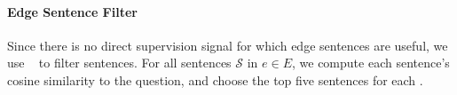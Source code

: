 \paragraph{Edge Sentence Filter}

Since there is no direct supervision signal for which edge sentences
are useful, we use ~\cite{salton1983introduction} to filter
sentences.
%
For all sentences $\mathcal{S}$ in \tweennode{} $e \in E$, we compute
each sentence's  cosine similarity to the question, and choose the
top five sentences for each \tweennode{}.




